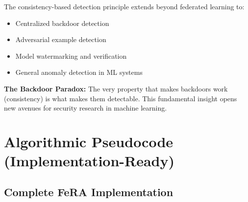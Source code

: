 \documentclass[11pt,a4paper]{article}
\begin{document}
The consistency-based detection principle extends beyond federated learning to:
\begin{itemize}
    \item Centralized backdoor detection
    \item Adversarial example detection
    \item Model watermarking and verification
    \item General anomaly detection in ML systems
\end{itemize}

\textbf{The Backdoor Paradox:} The very property that makes backdoors work (consistency) is what makes them detectable. This fundamental insight opens new avenues for security research in machine learning.

\appendix

\section{Algorithmic Pseudocode (Implementation-Ready)}

\subsection{Complete FeRA Implementation}
\end{document}
